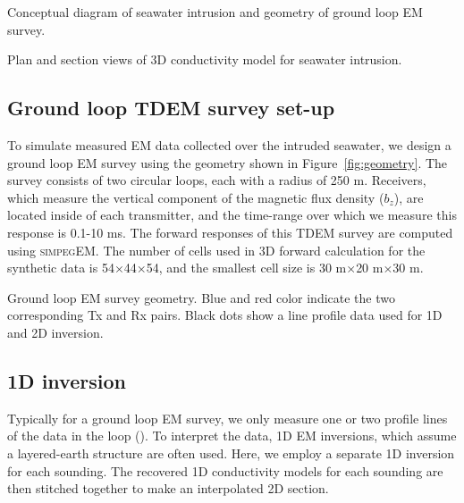 \documentclass{segabs}
\newcommand{\simpegEM}{\textsc{simpegEM}\xspace}
\begin{document}
{Conceptual diagram of seawater intrusion and geometry of ground loop EM survey.}

{Plan and section views of 3D conductivity model for seawater intrusion.}

\subsection*{Ground loop TDEM survey set-up}
To simulate measured EM data collected over the intruded seawater, we design a  ground loop EM survey using the geometry shown in Figure~\ref{fig:geometry}. The survey consists of two circular loops, each with a radius of 250 m. Receivers, which measure the vertical component of the magnetic flux density ($b_z$), are located inside of each transmitter, and the time-range over which we measure this response is 0.1-10 ms. The forward responses of this TDEM survey are computed using \simpegEM. The number of cells used in 3D forward calculation for the synthetic data is 54$\times$44$\times$54, and the smallest cell size is 30 m$\times$20 m$\times$30 m.

{Ground loop EM survey geometry. Blue and red color indicate the two corresponding Tx and Rx pairs. Black dots show a line profile data used for 1D and 2D inversion. }


\subsection*{1D inversion}
Typically for a ground loop EM survey, we only measure one or two profile lines of the data in the loop (\cite{Mills1988}). To interpret the data, 1D EM inversions, which assume a layered-earth structure are often used. Here, we employ a separate 1D inversion for each sounding. The recovered 1D conductivity models for each sounding are then stitched together to make an interpolated 2D section.
\end{document}
